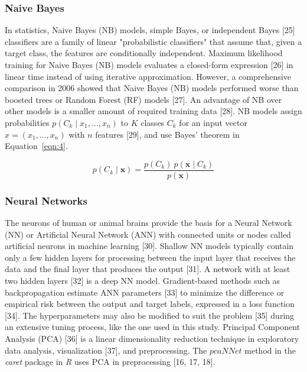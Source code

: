 \let\LaTeXcline\cline\documentclass[sn-mathphys-num]{sn-jnl}\let\cline\LaTeXcline
\begin{document}
\subsubsection{Naive Bayes}

In statistics, Naive Bayes (NB) models, simple Bayes, or independent Bayes [25] classifiers are a family of linear "probabilistic classifiers" that assume that, given a target class, the features are conditionally independent. Maximum likelihood training for Naive Bayes (NB) models evaluates a closed-form expression [26] in linear time instead of using iterative approximation. However, a comprehensive comparison in 2006 showed that Naive Bayes (NB) models performed worse than boosted trees or Random Forest (RF) models [27]. An advantage of NB over other models is a smaller amount of required training data [28]. NB models assign probabilities $p(C_{k}\mid x_{1},\ldots, x_{n})$ to $K$ classes $C_{k}$ for an input vector $x = (x_{1},\ldots, x_{n})$ with $n$ features [29], and use Bayes' theorem in Equation~\ref{eqn:4}.

\begin{equation}
	p(C_{k}\mid \mathbf{x})={\frac{p(C_{k})\ p(\mathbf{x} \mid C_{k})}{p(\mathbf{x})}}
	\label{eqn:4}
\end{equation}

\subsubsection{Neural Networks}

The neurons of human or animal brains provide the basis for a Neural Network (NN) or Artificial Neural Network (ANN) with connected units or nodes called artificial neurons in machine learning [30]. Shallow NN models typically contain only a few hidden layers for processing between the input layer that receives the data and the final layer that produces the output [31]. A network with at least two hidden layers [32] is a deep NN model. Gradient-based methods such as backpropagation estimate ANN parameters [33] to minimize the difference or empirical risk between the output and target labels, expressed in a loss function [34]. The hyperparameters may also be modified to suit the problem [35] during an extensive tuning process, like the one used in this study. Principal Component Analysis (PCA) [36] is a linear dimensionality reduction technique in exploratory data analysis, visualization [37], and preprocessing. The $pcaNNet$ method in the \textit{caret} package in \textit{R} uses PCA in preprocessing [16, 17, 18].
\end{document}

